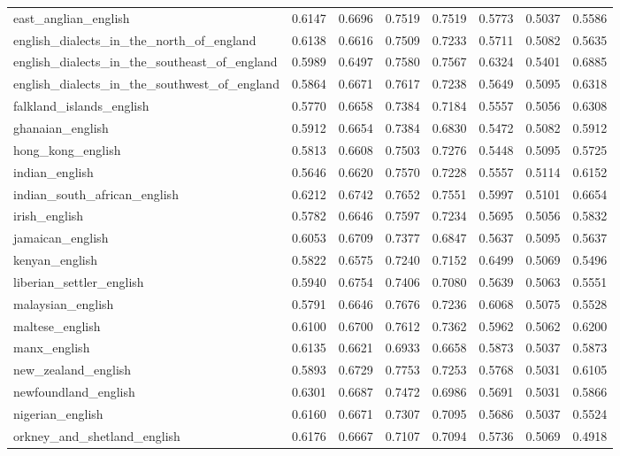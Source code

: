\begin{landscape}
\begin{longtable}{lccccccc}
east\_anglian\_english & 0.6147 & 0.6696 & 0.7519 & 0.7519 & 0.5773 & 0.5037 & 0.5586 \\
english\_dialects\_in\_the\_north\_of\_england & 0.6138 & 0.6616 & 0.7509 & 0.7233 & 0.5711 & 0.5082 & 0.5635 \\
english\_dialects\_in\_the\_southeast\_of\_england & 0.5989 & 0.6497 & 0.7580 & 0.7567 & 0.6324 & 0.5401 & 0.6885 \\
english\_dialects\_in\_the\_southwest\_of\_england & 0.5864 & 0.6671 & 0.7617 & 0.7238 & 0.5649 & 0.5095 & 0.6318 \\
falkland\_islands\_english & 0.5770 & 0.6658 & 0.7384 & 0.7184 & 0.5557 & 0.5056 & 0.6308 \\
ghanaian\_english & 0.5912 & 0.6654 & 0.7384 & 0.6830 & 0.5472 & 0.5082 & 0.5912 \\
hong\_kong\_english & 0.5813 & 0.6608 & 0.7503 & 0.7276 & 0.5448 & 0.5095 & 0.5725 \\
indian\_english & 0.5646 & 0.6620 & 0.7570 & 0.7228 & 0.5557 & 0.5114 & 0.6152 \\
indian\_south\_african\_english & 0.6212 & 0.6742 & 0.7652 & 0.7551 & 0.5997 & 0.5101 & 0.6654 \\
irish\_english & 0.5782 & 0.6646 & 0.7597 & 0.7234 & 0.5695 & 0.5056 & 0.5832 \\
jamaican\_english & 0.6053 & 0.6709 & 0.7377 & 0.6847 & 0.5637 & 0.5095 & 0.5637 \\
kenyan\_english & 0.5822 & 0.6575 & 0.7240 & 0.7152 & 0.6499 & 0.5069 & 0.5496 \\
liberian\_settler\_english & 0.5940 & 0.6754 & 0.7406 & 0.7080 & 0.5639 & 0.5063 & 0.5551 \\
malaysian\_english & 0.5791 & 0.6646 & 0.7676 & 0.7236 & 0.6068 & 0.5075 & 0.5528 \\
maltese\_english & 0.6100 & 0.6700 & 0.7612 & 0.7362 & 0.5962 & 0.5062 & 0.6200 \\
manx\_english & 0.6135 & 0.6621 & 0.6933 & 0.6658 & 0.5873 & 0.5037 & 0.5873 \\
new\_zealand\_english & 0.5893 & 0.6729 & 0.7753 & 0.7253 & 0.5768 & 0.5031 & 0.6105 \\
newfoundland\_english & 0.6301 & 0.6687 & 0.7472 & 0.6986 & 0.5691 & 0.5031 & 0.5866 \\
nigerian\_english & 0.6160 & 0.6671 & 0.7307 & 0.7095 & 0.5686 & 0.5037 & 0.5524 \\
orkney\_and\_shetland\_english & 0.6176 & 0.6667 & 0.7107 & 0.7094 & 0.5736 & 0.5069 & 0.4918 \\

\end{longtable}
\end{landscape}
